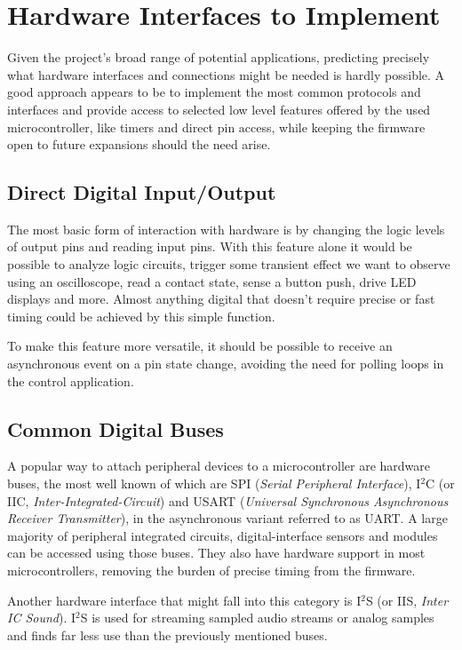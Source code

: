 \section{Hardware Interfaces to Implement}

Given the project's broad range of potential applications, predicting precisely what hardware interfaces and connections might be needed is hardly possible. A good approach appears to be to implement the most common protocols and interfaces and provide access to selected low level features offered by the used microcontroller, like timers and direct pin access, while keeping the firmware open to future expansions should the need arise.

\subsection{Direct Digital Input/Output}

The most basic form of interaction with hardware is by changing the logic levels of output pins and reading input pins. With this feature alone it would be possible to analyze logic circuits, trigger some transient effect we want to observe using an oscilloscope, read a contact state, sense a button push, drive LED displays and more. Almost anything digital that doesn't require precise or fast timing could be achieved by this simple function.

To make this feature more versatile, it should be possible to receive an asynchronous event on a pin state change, avoiding the need for polling loops in the control application.

\subsection{Common Digital Buses}

A popular way to attach peripheral devices to a microcontroller are hardware buses, the most well known of which are SPI (\textit{Serial Peripheral Interface}), I$^2$C (or IIC, \textit{Inter-Integrated-Circuit}) and USART (\textit{Universal Synchronous Asynchronous Receiver Transmitter}), in the asynchronous variant referred to as UART. A large majority of peripheral integrated circuits, digital-interface sensors and modules can be accessed using those buses. They also have hardware support in most microcontrollers, removing the burden of precise timing from the firmware.

Another hardware interface that might fall into this category is I$^2$S (or IIS, \textit{Inter IC Sound}). I$^2$S is used for streaming sampled audio streams or analog samples and finds far less use than the previously mentioned buses.

